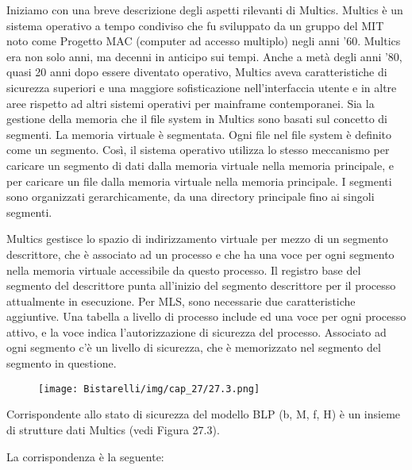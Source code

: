 \singlespacing

Iniziamo con una breve descrizione degli aspetti rilevanti di Multics. Multics è un sistema operativo a tempo condiviso che fu sviluppato da un gruppo del MIT noto come Progetto MAC (computer ad accesso multiplo) negli anni '60. Multics era non solo anni, ma decenni in anticipo sui tempi. Anche a metà degli anni '80, quasi 20 anni dopo essere diventato operativo, Multics aveva caratteristiche di sicurezza superiori e una maggiore sofisticazione nell'interfaccia utente e in altre aree rispetto ad altri sistemi operativi per mainframe contemporanei. Sia la gestione della memoria che il file system in Multics sono basati sul concetto di segmenti. La memoria virtuale è segmentata. Ogni file nel file system è definito come un segmento. Così, il sistema operativo utilizza lo stesso meccanismo per caricare un segmento di dati dalla memoria virtuale nella memoria principale, e per caricare un file dalla memoria virtuale nella memoria principale. I segmenti sono organizzati gerarchicamente, da una directory principale fino ai singoli segmenti.

\singlespacing

Multics gestisce lo spazio di indirizzamento virtuale per mezzo di un segmento descrittore, che è associato ad un processo e che ha una voce per ogni segmento nella memoria virtuale accessibile da questo processo. Il registro base del segmento del descrittore punta all'inizio del segmento descrittore per il processo attualmente in esecuzione. Per MLS, sono necessarie due caratteristiche aggiuntive. Una tabella a livello di processo include ed una voce per ogni processo attivo, e la voce indica l'autorizzazione di sicurezza del processo. Associato ad ogni segmento c'è un livello di sicurezza, che è memorizzato nel segmento del segmento in questione.

\begin{figure}[H]
	\centering
    \texttt{[image: Bistarelli/img/cap\_27/27.3.png]}
\end{figure}


Corrispondente allo stato di sicurezza del modello BLP (b, M, f, H) è un insieme di strutture dati Multics (vedi Figura 27.3).

La corrispondenza è la seguente:

